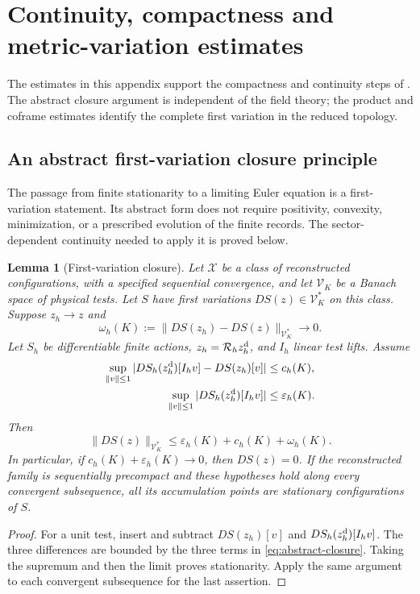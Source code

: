 \documentclass[11pt]{article}
\numberwithin{equation}{section}
\newtheorem{lemma}[lemma]{Lemma}
\theoremstyle{definition}
\theoremstyle{remark}
\newcommand{\norm}[1]{\lVert#1\rVert}
\begin{document}
\section{Continuity, compactness and metric-variation estimates}
\label{app:analytic-preliminaries}

The estimates in this appendix support the compactness and continuity
steps of . The abstract closure argument is
independent of the field theory; the product and coframe estimates identify
the complete first variation in the reduced topology.

\subsection{An abstract first-variation closure principle}

The passage from finite stationarity to a limiting Euler equation is a
first-variation statement.  Its abstract form does not require positivity,
convexity, minimization, or a prescribed evolution of the finite records.
The sector-dependent continuity needed to apply it is proved below.

\begin{lemma}[First-variation closure]
\label{thm:abstract-closure}
Let $\mathscr X$ be a class of reconstructed configurations, with a specified
sequential convergence, and let $\mathscr V_K$ be a Banach space of physical
tests.  Let $S$ have first variations $DS(z)\in\mathscr V_K^*$ on this class.
Suppose $z_h\to z$ and
\begin{equation}
 \omega_h(K):=\norm{DS(z_h)-DS(z)}_{\mathscr V_K^*}\longrightarrow0.
 \label{eq:abstract-continuity}
\end{equation}
Let $S_h$ be differentiable finite actions, $z_h=\mathcal R_hz_h^{\rm d}$,
and $I_h$ linear test lifts.  Assume
\begin{align}
 \sup_{\norm v\le1}|DS_h(z_h^{\rm d})[I_hv]-DS(z_h)[v]|&\le c_h(K),\notag\\
 \sup_{\norm v\le1}|DS_h(z_h^{\rm d})[I_hv]|&\le\varepsilon_h(K).
 \label{eq:abstract-budgets}
\end{align}
Then
\begin{equation}
 \norm{DS(z)}_{\mathscr V_K^*}
 \le\varepsilon_h(K)+c_h(K)+\omega_h(K).
 \label{eq:abstract-closure}
\end{equation}
In particular, if $c_h(K)+\varepsilon_h(K)\to0$, then $DS(z)=0$.
If the reconstructed family is sequentially precompact and these hypotheses
hold along every convergent subsequence, all its accumulation points are
stationary configurations of $S$.
\end{lemma}
\begin{proof}
For a unit test, insert and subtract $DS(z_h)[v]$ and
$DS_h(z_h^{\rm d})[I_hv]$.  The three differences are bounded by the three
terms in \eqref{eq:abstract-closure}.  Taking the supremum and then the limit
proves stationarity.  Apply the same argument to each convergent subsequence
for the last assertion.
\end{proof}
\end{document}
